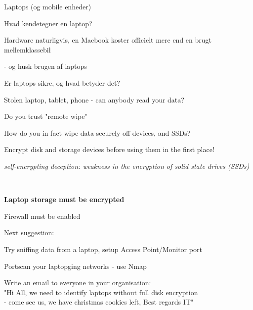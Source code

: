 \documentclass[Screen16to9,17pt]{foils}
\begin{document}


\begin{list2}
\item Laptops (og mobile enheder)
\item Hvad kendetegner en laptop?
\item Hardware naturligvis, en Macbook koster officielt mere end en brugt mellemklassebil
\item - og husk brugen af laptops
\item Er laptops sikre, og hvad betyder det?
\end{list2}





\begin{list1}
\item Stolen laptop, tablet, phone - can anybody read your data?
\item Do you trust "remote wipe"
\item How do you in fact wipe data securely off devices, and SSDs?
\item Encrypt disk and storage devices before using them in the first place!
\end{list1}


\emph{self-encrypting deception: weakness in the encryption of solid state drives (SSDs)}\\






{~}
\begin{list1}
\item {\bf Laptop storage must be encrypted}
\item Firewall must be enabled
\item Next suggestion:
\begin{list2}
\item Try sniffing data from a laptop, setup Access Point/Monitor port
\item Portscan your laptopging networks - use Nmap
\item Write an email to everyone in your organisation:\\
"Hi All, we need to identify laptops without full disk encryption \\
- come see us, we have christmas cookies left, Best regards IT"
\end{list2}
\end{list1}
\end{document}

